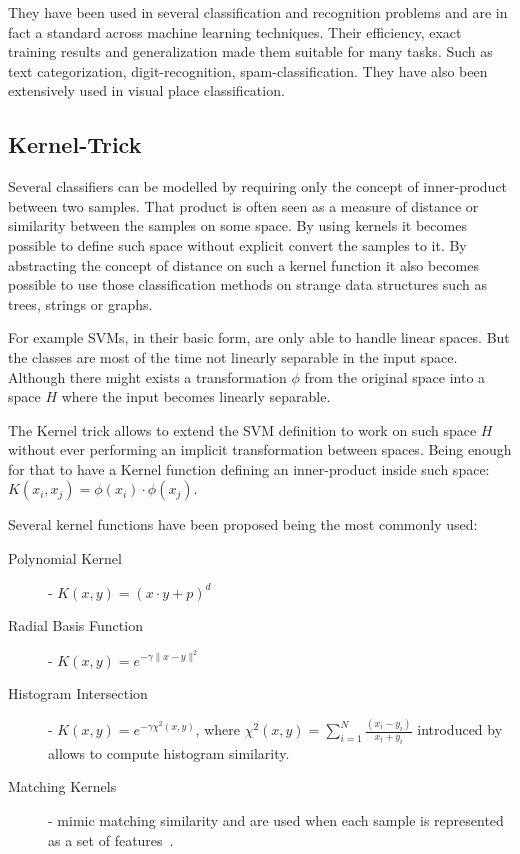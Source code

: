 They have been used in several classification and recognition problems and are
in fact a standard across machine learning techniques. Their efficiency, exact
training results and generalization made them suitable for many tasks. Such as
text categorization, digit-recognition, spam-classification.
They have also been extensively used in visual place classification.

\subsection{Kernel-Trick}
\label{sec:kernel-trick}
Several classifiers can be modelled by requiring only the concept of inner\hyp{}product
between two samples. That product is often seen as a measure of distance or similarity
between the samples on some space. By using kernels it becomes possible to define such
space without explicit convert the samples to it. By abstracting the concept of distance
on such a kernel function it also becomes possible to use those classification methods
on strange data structures such as trees, strings or graphs.

For example \glspl{SVM}, in their basic form, are only able to handle linear spaces.
But the classes are most of the time not linearly separable in the input
space. Although there might exists a transformation $\phi$ from the original
space into a space $H$ where the input becomes linearly separable.

The Kernel trick allows to extend the \gls{SVM} definition to work on such space
$H$ without ever performing an implicit transformation between spaces. Being
enough for that to have a Kernel function defining an inner-product inside such
space: $K(x_i, x_j) = \phi(x_i)\cdot\phi(x_j)$.

Several kernel functions have been proposed being the most commonly used:

\begin{description}
\item[Polynomial Kernel] - $K(x, y) = (x \cdot y + p)^d$
\item[Radial Basis Function] - $K(x, y) = e^{-\gamma\|x - y \|^2}$
\item[Histogram Intersection] - $K(x, y) = e^{-\gamma \chi^2(x,y)}$, where
$\chi^2(x,y) = \sum_{i=1}^{N}\frac{(x_i-y_i)}{x_i+y_i}$ introduced by
\cite{barla2003histogram} allows to compute histogram similarity.
\item[Matching Kernels] - mimic matching similarity and are used when each
sample is represented as a set of features~\citep{boughorbel2005intermediate}.
\end{description}



